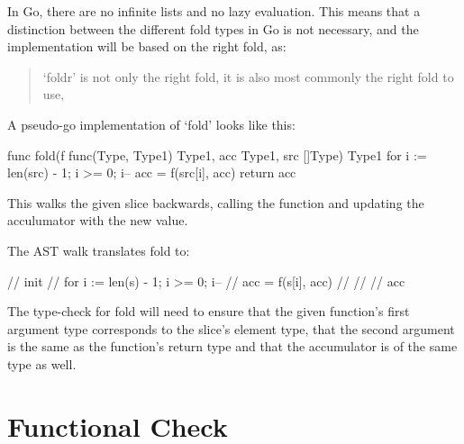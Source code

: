 In Go, there are no infinite lists and no lazy evaluation. This means that a distinction
between the different fold types in Go is not necessary, and the implementation will
be based on the right fold, as:

\begin{quote}
    `foldr' is not only the right fold, it is also most commonly the right fold to use,
\end{quote}\cite{fold-types}

A pseudo-go implementation of `fold' looks like this:
\begin{code}
    \begin{gocode}
func fold(f func(Type, Type1) Type1, acc Type1, src []Type) Type1 {
    for i := len(src) - 1; i >= 0; i-- {
        acc = f(src[i], acc)
    }
    return acc
}
    \end{gocode}
\end{code}

This walks the given slice backwards, calling the function and updating the acculumator with
the new value.

The AST walk translates fold to:
\begin{code}
    \begin{gocode}
//   init {
//     for i := len(s) - 1; i >= 0; i-- {
//       acc = f(s[i], acc)
//     }
//   }
//   acc
    \end{gocode}
\end{code}

The type-check for fold will need to ensure that the given function's first argument type corresponds
to the slice's element type, that the second argument is the same as the function's return type and
that the accumulator is of the same type as well.

\section{Functional Check}
